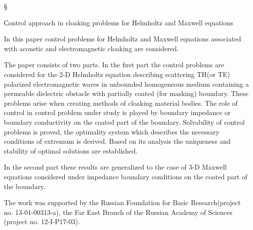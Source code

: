\documentclass[12pt,a4paper]{article}
\begin{document}
§

\begin{center}
Сontrol approach in cloaking problems for Helmholtz and Maxwell
equations
\end{center}

In this paper control problems for Helmholtz and Maxwell equations associated with
acoustic and electromagnetic cloaking are considered.

The paper consists of two parts. In the first part the control problems are considered for
the 2-D Helmholtz equation describing scattering TH(or TE) polarized electromagnetic waves in
unbounded homogeneous medium containing a permeable dielectric obstacle with partially coated 
(for masking) boundary. These problems arise when creating methods of cloaking material
bodies. The role of control in control problem under study is played by boundary impedance
or boundary conductivity on the coated part of the boundary. Solvability of control problems is proved,
the optimality system which describes the necessary conditions of extremum is derived.
Based on its analysis the uniqueness and stability of optimal solutions are
established.

In the second part these results are generalized to the case of 3-D Maxwell equations considered
under impedance boundary conditions on the coated part of the boundary.

The work was supported by the Russian Foundation for Basic Research(project no. 13-01-00313-a), the Far East Branch
of the Russian Academy of Sciences (project no. 12-I-P17-03).
\end{document}
